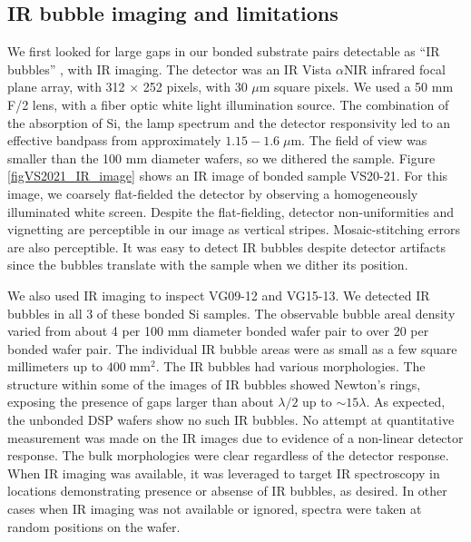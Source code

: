 \subsection{IR bubble imaging and limitations}

We first looked for large gaps in our bonded substrate pairs detectable as ``IR bubbles'' \cite{1992JEMat..21..669M}, with IR imaging.  The detector was an IR Vista $\alpha$NIR infrared focal plane array, with 312 $\times$ 252 pixels, with 30 $\mu$m square pixels.  We used a 50 mm F/2 lens, with a fiber optic white light illumination source.  The combination of the absorption of Si, the lamp spectrum and the detector responsivity led to an effective bandpass from approximately $1.15-1.6\;\mu$m.  The field of view was smaller than the 100 mm diameter wafers, so we dithered the sample.  Figure \ref{figVS2021_IR_image} shows an IR image of bonded sample VS20-21.  For this image, we coarsely flat-fielded the detector by observing a homogeneously illuminated white screen. Despite the flat-fielding, detector non-uniformities and vignetting are perceptible in our image as vertical stripes.  Mosaic-stitching errors are also perceptible.  It was easy to detect IR bubbles despite detector artifacts since the bubbles translate with the sample when we dither its position.

We also used IR imaging to inspect VG09-12 and VG15-13.  We detected IR bubbles in all 3 of these bonded Si samples.  The observable bubble areal density varied from about 4 per 100 mm diameter bonded wafer pair to over 20 per bonded wafer pair.  The individual IR bubble areas were as small as a few square millimeters up to $400\;\mathrm{mm}^2$.  The IR bubbles had various morphologies.  The structure within some of the images of IR bubbles showed Newton's rings, exposing the presence of gaps larger than about $\lambda/2$ up to $\sim 15 \lambda$.  As expected, the unbonded DSP wafers show no such IR bubbles.  No attempt at quantitative measurement was made on the IR images due to evidence of a non-linear detector response.  The bulk morphologies were clear regardless of the detector response.  When IR imaging was available, it was leveraged to target IR spectroscopy in locations demonstrating presence or absense of IR bubbles, as desired.  In other cases when IR imaging was not available or ignored, spectra were taken at random positions on the wafer.

